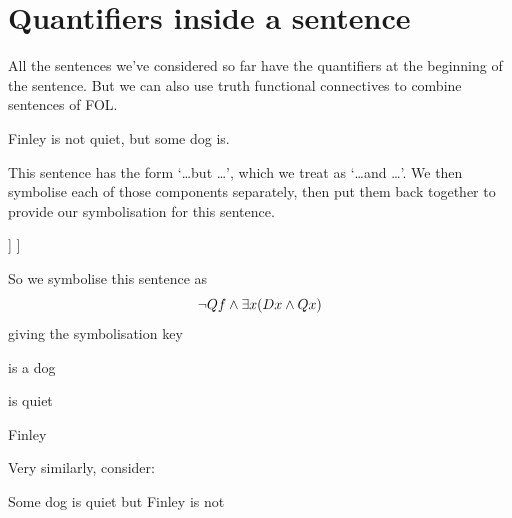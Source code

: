 \section{Quantifiers inside a sentence}

All the sentences we've considered so far have the quantifiers at the beginning of the sentence. But we can also use truth functional connectives to combine sentences of FOL.


\begin{samplesent}
	\item\label{sent:q:dog}Finley is not quiet, but some dog is.
\end{samplesent}

This sentence has the form `\ldots but \ldots', which we treat as `\ldots and \ldots'. We then symbolise each of those components separately, then put them back together to provide our symbolisation for this sentence. 
\begin{center}
	\begin{forest}
		[{
			Finley is not quiet, but some dog is\\\ldots and \ldots\\$\ldots {\eand}\ldots$}
		[Finley is not quiet\\$\enot Qf$]
		[Some dog is quiet\\There exists $x$: \ldots and \ldots\\${\exists x}(\ldots\eand\ldots)$
		[$x$ is a dog\\$Dx$]
		[$x$ is quiet\\$Qx$]
		]
		]
	\end{forest}
\end{center}

So we symbolise this sentence as $$\neg Qf\mathbin{\wedge} \exists x(Dx\wedge Qx)$$
giving the symbolisation key
\begin{ekey}
	\item[Dx] is a dog
	\item[Qx] is quiet
	\item[f] Finley
\end{ekey}


Very similarly, consider:
\begin{samplesent}
	\item\label{sent:q:dog2}Some dog is quiet but Finley is not
\end{samplesent}


